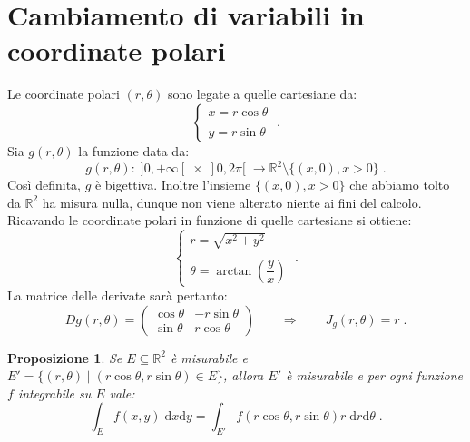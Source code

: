 \documentclass[a4paper,12pt]{report}
\theoremstyle{plain}
\newtheorem{prop}{Proposizione}[section]
\theoremstyle{definition}
\theoremstyle{remark}
\newcommand{\diff}[1]{\mathrm{d}#1}
\numberwithin{equation}{section}
\begin{document}
\section{Cambiamento di variabili in coordinate polari}
Le coordinate polari $(r,\theta)$ sono legate a quelle cartesiane da:
\begin{equation}
\begin{cases}
 x=r\cos\theta \\
\\
y=r\sin\theta
\end{cases}\;.
\end{equation}
Sia $g(r,\theta)$ la funzione data da:
\begin{equation}
g(r,\theta):\;]0,+\infty[\;\times\;]0,2\pi[\;\to\mathbb{R}^2\setminus\{(x,0),x>0\}\;.
\end{equation}
Così definita, $g$ è bigettiva. Inoltre l'insieme $\{(x,0),x>0\}$ che abbiamo tolto da $\mathbb{R}^2$ ha misura nulla, dunque non viene 
alterato niente ai fini del calcolo. Ricavando le coordinate polari in funzione di quelle cartesiane si ottiene:
\begin{equation}
\begin{cases}
r=\sqrt{x^2+y^2} \\
\\
\theta=\arctan\left(\dfrac{y}{x}\right)
\end{cases}\;.
\end{equation}
La matrice delle derivate sarà pertanto:
\begin{equation}
Dg(r,\theta)=\left(\begin{matrix}
                    \cos\theta & -r\sin\theta \\
\sin\theta & r\cos\theta
                   \end{matrix}\right)\qquad \Longrightarrow \qquad J_g(r,\theta)=r\;.
\end{equation}
\begin{prop} Se $E\subseteq \mathbb{R}^2$ è misurabile e $E'=\{(r,\theta)\;|\;(r\cos\theta,r\sin\theta)\in E\}$, allora $E'$ è misurabile e per ogni funzione $f$ integrabile su $E$ vale:
\begin{equation}
\int_E f(x,y)\;\diff{x}\diff{y}=\int_{E'} f(r\cos\theta,r\sin\theta)r\;\diff{r} \diff{\theta}\;.
\end{equation}
\end{prop}
\end{document}
